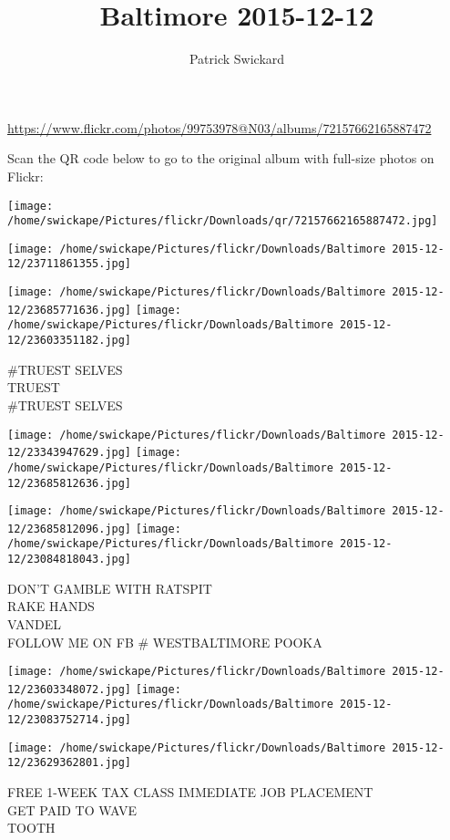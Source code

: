 \documentclass[10pt,letterpaper]{article}
\title{Baltimore 2015-12-12}
\author{Patrick Swickard}
\date{}
\begin{document}
\maketitle

\url{https://www.flickr.com/photos/99753978@N03/albums/72157662165887472}

Scan the QR code below to go to the original album with full-size photos on Flickr:

\texttt{[image: /home/swickape/Pictures/flickr/Downloads/qr/72157662165887472.jpg]}
\pagebreak

\texttt{[image: /home/swickape/Pictures/flickr/Downloads/Baltimore 2015-12-12/23711861355.jpg]}

\vspace{0.25in}
\texttt{[image: /home/swickape/Pictures/flickr/Downloads/Baltimore 2015-12-12/23685771636.jpg]}
\texttt{[image: /home/swickape/Pictures/flickr/Downloads/Baltimore 2015-12-12/23603351182.jpg]}

\#TRUEST SELVES\\
TRUEST\\
\#TRUEST SELVES
\pagebreak

\texttt{[image: /home/swickape/Pictures/flickr/Downloads/Baltimore 2015-12-12/23343947629.jpg]}
\texttt{[image: /home/swickape/Pictures/flickr/Downloads/Baltimore 2015-12-12/23685812636.jpg]}

\texttt{[image: /home/swickape/Pictures/flickr/Downloads/Baltimore 2015-12-12/23685812096.jpg]}
\texttt{[image: /home/swickape/Pictures/flickr/Downloads/Baltimore 2015-12-12/23084818043.jpg]}

DON'T GAMBLE WITH RATSPIT\\
RAKE HANDS\\
VANDEL\\
FOLLOW ME ON FB \# WESTBALTIMORE POOKA
\pagebreak

\texttt{[image: /home/swickape/Pictures/flickr/Downloads/Baltimore 2015-12-12/23603348072.jpg]}
\texttt{[image: /home/swickape/Pictures/flickr/Downloads/Baltimore 2015-12-12/23083752714.jpg]}

\vspace{0.25in}
\texttt{[image: /home/swickape/Pictures/flickr/Downloads/Baltimore 2015-12-12/23629362801.jpg]}

FREE 1{-}WEEK TAX CLASS IMMEDIATE JOB PLACEMENT\\
GET PAID TO WAVE\\
TOOTH
\pagebreak
\end{document}
